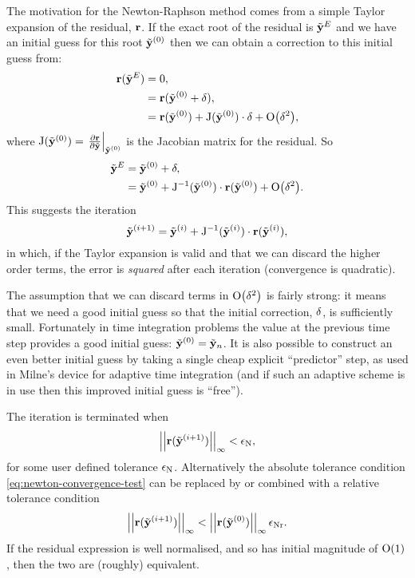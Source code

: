 The motivation for the Newton-Raphson method comes from a simple Taylor expansion of the residual, $\mathbf{r}$.
If the exact root of the residual is $\tilde{\mathbf{y}}^E$ and we have an initial guess for this root ${\tilde{\mathbf{y}}}^{(0)}$ then we can obtain a correction to this initial guess from:
\begin{equation}
  \begin{aligned}
    \mathbf{r}(\tilde{\mathbf{y}}^E) &= 0, \\
    &= \mathbf{r}({\tilde{\mathbf{y}}}^{(0)} + \mathbf{\delta}), \\
    &= \mathbf{r}({\tilde{\mathbf{y}}}^{(0)}) + \mathrm{J}({\tilde{\mathbf{y}}}^{(0)}) \cdot \mathbf{\delta} + \text{O}{\left( \mathbf{\delta}^2 \right)},
  \end{aligned}
\end{equation}
where $\mathrm{J}({\tilde{\mathbf{y}}}^{(0)}) = {\left. {\frac{\partial \mathbf{r}}{\partial \tilde{\mathbf{y}}}} \right|_{{\tilde{\mathbf{y}}}^{(0)}}}$ is the Jacobian matrix for the residual.
So
\begin{equation}
  \begin{aligned}
    \label{eq:49}
    \tilde{\mathbf{y}}^E &= {\tilde{\mathbf{y}}}^{(0)} + \mathbf{\delta}, \\
    &= {\tilde{\mathbf{y}}}^{(0)} + \mathrm{J}^{-1}({\tilde{\mathbf{y}}}^{(0)}) \cdot \mathbf{r}({\tilde{\mathbf{y}}}^{(0)}) + \text{O}{\left( \mathbf{\delta}^2 \right)}.
  \end{aligned}
\end{equation}
This suggests the iteration
\begin{equation}
  {\tilde{\mathbf{y}}}^{(i+1)} = {\tilde{\mathbf{y}}}^{(i)} + \mathrm{J}^{-1}({\tilde{\mathbf{y}}}^{(i)}) \cdot \mathbf{r}({\tilde{\mathbf{y}}}^{(i)}),
\end{equation}
in which, if the Taylor expansion is valid and that we can discard the higher order terms, the error is \emph{squared} after each iteration (\ie convergence is quadratic).

The assumption that we can discard terms in $\text{O}{\left( \mathbf{\delta}^2 \right)}$ is fairly strong: it means that we need a good initial guess so that the initial correction, $\mathbf{\delta}$, is sufficiently small.
Fortunately in time integration problems the value at the previous time step provides a good initial guess: ${\tilde{\mathbf{y}}}^{(0)} = \tilde{\mathbf{y}}_n$.
It is also possible to construct an even better initial guess by taking a single cheap explicit ``predictor'' step, as used in Milne's device for adaptive time integration (and if such an adaptive scheme is in use then this improved initial guess is ``free'').

The iteration is terminated when
\begin{equation}
  \left| \left| \mathbf{r}({\tilde{\mathbf{y}}}^{(i+1)}) \right| \right|_{\infty} < \epsilon_{\text{N}},
\label{eq:newton-convergence-test}
\end{equation}
for some user defined tolerance $\epsilon_{\text{N}}$.
Alternatively the absolute tolerance condition \cref{eq:newton-convergence-test} can be replaced by or combined with a relative tolerance condition
\begin{equation}
  \left| \left| \mathbf{r}({\tilde{\mathbf{y}}}^{(i+1)}) \right| \right|_{\infty} < \left| \left| \mathbf{r}({\tilde{\mathbf{y}}}^{(0)}) \right| \right|_{\infty} \epsilon_{\text{Nr}}.
\end{equation}
If the residual expression is well normalised, and so has initial magnitude of $\text{O}{\left( 1 \right)}$, then the two are (roughly) equivalent. 

